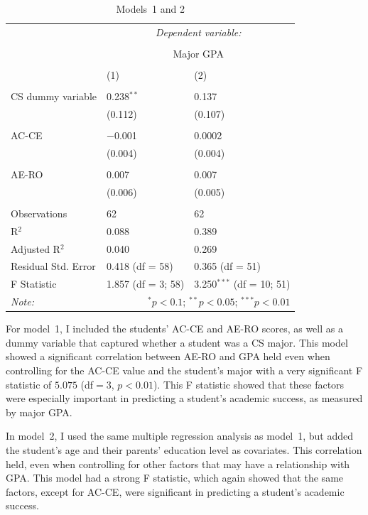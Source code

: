 \begin{table}[!htbp]
  \centering
  \caption[Models~1 and 2]{Models~1 and 2}
  \label{tab:models12}
  \begin{tabular}{@{\extracolsep{5pt}}lll}
  \toprule
   & \multicolumn{2}{c}{\textit{Dependent variable:}} \\
  \cline{2-3}
  \\[-1.8ex] & \multicolumn{2}{c}{Major GPA} \\
  \\[-1.8ex] & (1) & (2)\\
  \hline \\[-1.8ex]
  CS dummy variable & 0.238$^{**}$ & 0.137 \\
    & (0.112) & (0.107) \\
    & & \\
  AC-CE & $-$0.001 & 0.0002 \\
    & (0.004) & (0.004) \\
    & & \\
  AE-RO & 0.007 & 0.007 \\
    & (0.006) & (0.005) \\
    & & \\
  \midrule
  Observations & 62 & 62 \\
  R$^{2}$ & 0.088 & 0.389 \\
  Adjusted R$^{2}$ & 0.040 & 0.269 \\
  Residual Std. Error & 0.418 (df = 58) & 0.365 (df = 51) \\
  F Statistic & 1.857 (df = 3; 58) & 3.250$^{***}$ (df = 10; 51) \\
  \bottomrule
  \textit{Note:}  & \multicolumn{2}{r}{$^{*}p<0.1$; $^{**}p<0.05$; $^{***}p<0.01$} \\
  \end{tabular}
\end{table}

For model~1, I included the students' AC-CE and AE-RO scores, as well as a dummy variable that captured whether a student was a CS major. This model showed a significant correlation between AE-RO and GPA held even when controlling for the AC-CE value and the student's major with a very significant F statistic of $5.075$ (df$=3$, $p<0.01$). This F statistic showed that these factors were especially important in predicting a student's academic success, as measured by major GPA.

In model~2, I used the same multiple regression analysis as model~1, but added the student's age and their parents' education level as covariates. This correlation held, even when controlling for other factors that may have a relationship with GPA. This model had a strong F statistic, which again showed that the same factors, except for AC-CE, were significant in predicting a student's academic success.

